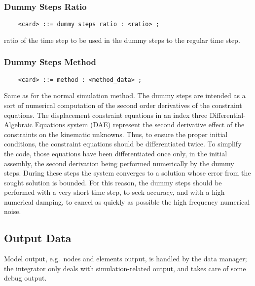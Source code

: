 \subsubsection{Dummy Steps Ratio}
\begin{verbatim}
    <card> ::= dummy steps ratio : <ratio> ;
\end{verbatim}
ratio of the time step to be used in the dummy steps to the regular
time step.

\subsubsection{Dummy Steps Method}
\begin{verbatim}
    <card> ::= method : <method_data> ;
\end{verbatim}
Same as for the normal simulation method. 
The dummy steps are intended as a sort of numerical computation 
of the second order derivatives of the constraint equations. 
The displacement constraint equations in an index three 
Differential-Algebraic Equations system
(DAE) represent the second derivative effect of the constraints on the
kinematic unknowns. Thus, to ensure the proper initial conditions, the
constraint equations should be differentiated twice. To simplify the code,
those equations have been differentiated once only, in the initial assembly,
the second derivation being performed numerically by the dummy steps.
During these steps the system converges to a solution whose error from
the sought solution is bounded. For this reason, the dummy steps
should be performed with a very short time step, to seek accuracy, and
with a high numerical damping, to cancel as quickly as possible the high
frequency numerical noise.

\subsection{Output Data}\label{sec:PROBLEMS:OUTPUT}
Model output, e.g.\ nodes and elements output, is handled
by the data manager; the integrator only deals with
simulation-related output, and takes care of some debug output.

